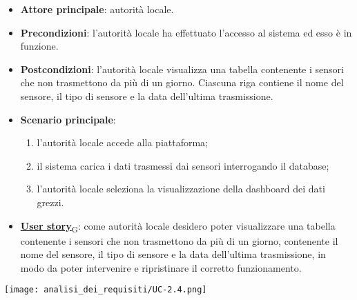 \begin{itemize}
	\item \textbf{Attore principale}: autorità locale.
	\item \textbf{Precondizioni}: l'autorità locale ha effettuato l'accesso al sistema ed esso è in funzione.
	\item \textbf{Postcondizioni}: l'autorità locale visualizza una tabella contenente i sensori che non trasmettono da più di un giorno. Ciascuna riga
	      contiene il nome del sensore, il tipo di sensore e la data dell'ultima trasmissione.
	\item \textbf{Scenario principale}:
	      \begin{enumerate}
		      \item l'autorità locale accede alla piattaforma;
		      \item il sistema carica i dati trasmessi dai sensori interrogando il database;
		      \item l'autorità locale seleziona la visualizzazione della dashboard dei dati grezzi.
	      \end{enumerate}
	\item \href{https://7last.github.io/docs/rtb/documentazione-interna/glossario\#user-story}{\textbf{User story}\textsubscript{G}}:
	      come autorità locale desidero poter visualizzare una tabella contenente i sensori che non trasmettono da più di un giorno, contenente
	      il nome del sensore, il tipo di sensore e la data dell'ultima trasmissione, in modo da poter intervenire e ripristinare il corretto funzionamento.
\end{itemize}
\begin{center}
	\texttt{[image: analisi\_dei\_requisiti/UC-2.4.png]}
\end{center}

